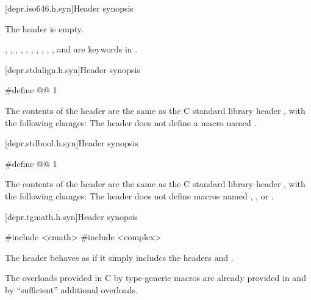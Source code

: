 [depr.iso646.h.syn]{Header  synopsis}

\pnum
The \Cpp{} header  is empty.
\begin{note}
,
,
,
,
,
,
,
,
,
, and
are keywords in \Cpp{}.
\end{note}

[depr.stdalign.h.syn]{Header  synopsis}

%
%
\begin{codeblock}
#define @@ 1
\end{codeblock}

\pnum
The contents of the \Cpp{} header  are the same as the C
standard library header , with the following changes:
The header  does not
define a macro named .


[depr.stdbool.h.syn]{Header  synopsis}

%
%
%
\begin{codeblock}
#define @@ 1
\end{codeblock}

\pnum
The contents of the \Cpp{} header  are the same as the C
standard library header , with the following changes:
The header  does not
define macros named , , or .


[depr.tgmath.h.syn]{Header  synopsis}

%
\begin{codeblock}
#include <cmath>
#include <complex>
\end{codeblock}

\pnum
The header 
behaves as if it simply includes the headers
 and
.

\pnum
\begin{note}
The overloads provided in C by type-generic macros
are already provided in  and 
by ``sufficient'' additional overloads.
\end{note}

